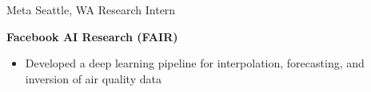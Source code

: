 
        {Meta}
        {Seattle, WA}
        {Research Intern}
        {}{
    \textbf{Facebook AI Research (FAIR)}
    \begin{itemize}
        \item Developed a deep learning pipeline for interpolation, forecasting, and inversion of air quality data
    \end{itemize}
}
